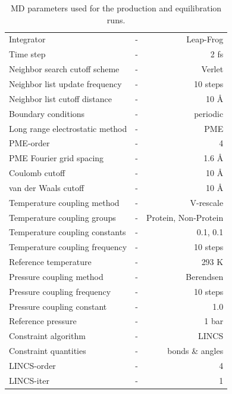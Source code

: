 \documentclass[english, a4paper, 12pt, titlepage, draft]{article}
\begin{document}
\begin{table}
\centering
\begin{tabular}{l c r}
    \hline \hline
    Integrator                      & - & Leap-Frog \\
    Time step                        & - & 2 fs \\
    Neighbor search cutoff scheme   & - & Verlet \\
    Neighbor list update frequency  & - & 10 steps \\
    Neighbor list cutoff distance   & - & 10 \r{A} \\
    Boundary conditions             & - & periodic \\
    Long range electrostatic method & - & PME \\
    PME-order                       & - & 4 \\
    PME Fourier grid spacing        & - & 1.6 \r{A} \\
    Coulomb cutoff                  & - & 10 \r{A} \\
    van der Waals cutoff            & - & 10 \r{A} \\
    Temperature coupling method     & - & V-rescale \\
    Temperature coupling groups     & - & Protein, Non-Protein \\
    Temperature coupling constants  & - & 0.1, 0.1 \\
    Temperature coupling frequency  & - & 10 steps \\
    Reference temperature           & - & 293 K \\
    Pressure coupling method        & - & Berendsen \\
    Pressure coupling frequency     & - & 10 steps \\
    Pressure coupling constant      & - & 1.0 \\
    Reference pressure              & - & 1 bar \\
    Constraint algorithm            & - & LINCS \\
    Constraint quantities           & - & bonds \& angles \\
    LINCS-order                     & - & 4 \\
    LINCS-iter                      & - & 1 \\
    \hline \hline
\end{tabular}
\caption{MD parameters used for the production and equilibration runs.}
\label{tab:MDparams}
\end{table}
\end{document}
